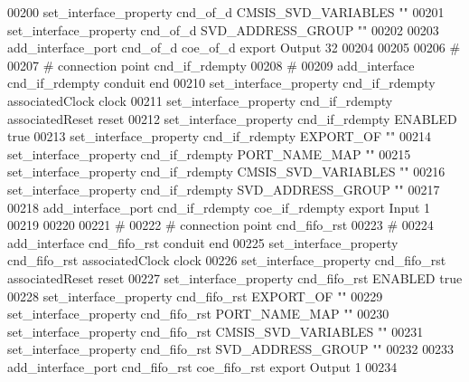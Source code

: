 \begin{DoxyCode}
00200 \textcolor{comment}{}set\_interface\_property cnd\_of\_d CMSIS\_SVD\_VARIABLES ""\textcolor{comment}{}
00201 \textcolor{comment}{}set\_interface\_property cnd\_of\_d SVD\_ADDRESS\_GROUP ""\textcolor{comment}{}
00202 \textcolor{comment}{}
00203 add\_interface\_port cnd\_of\_d coe\_of\_d export Output 32\textcolor{comment}{}
00204 \textcolor{comment}{}
00205 
00206 \textcolor{comment}{# }
00207 \textcolor{comment}{}\textcolor{comment}{# connection point cnd\_if\_rdempty}
00208 \textcolor{comment}{}\textcolor{comment}{# }
00209 \textcolor{comment}{}add\_interface cnd\_if\_rdempty conduit end\textcolor{comment}{}
00210 \textcolor{comment}{}set\_interface\_property cnd\_if\_rdempty associatedClock clock\textcolor{comment}{}
00211 \textcolor{comment}{}set\_interface\_property cnd\_if\_rdempty associatedReset reset\textcolor{comment}{}
00212 \textcolor{comment}{}set\_interface\_property cnd\_if\_rdempty ENABLED true\textcolor{comment}{}
00213 \textcolor{comment}{}set\_interface\_property cnd\_if\_rdempty EXPORT\_OF ""\textcolor{comment}{}
00214 \textcolor{comment}{}set\_interface\_property cnd\_if\_rdempty PORT\_NAME\_MAP ""\textcolor{comment}{}
00215 \textcolor{comment}{}set\_interface\_property cnd\_if\_rdempty CMSIS\_SVD\_VARIABLES ""\textcolor{comment}{}
00216 \textcolor{comment}{}set\_interface\_property cnd\_if\_rdempty SVD\_ADDRESS\_GROUP ""\textcolor{comment}{}
00217 \textcolor{comment}{}
00218 add\_interface\_port cnd\_if\_rdempty coe\_if\_rdempty export Input 1\textcolor{comment}{}
00219 \textcolor{comment}{}
00220 
00221 \textcolor{comment}{# }
00222 \textcolor{comment}{}\textcolor{comment}{# connection point cnd\_fifo\_rst}
00223 \textcolor{comment}{}\textcolor{comment}{# }
00224 \textcolor{comment}{}add\_interface cnd\_fifo\_rst conduit end\textcolor{comment}{}
00225 \textcolor{comment}{}set\_interface\_property cnd\_fifo\_rst associatedClock clock\textcolor{comment}{}
00226 \textcolor{comment}{}set\_interface\_property cnd\_fifo\_rst associatedReset reset\textcolor{comment}{}
00227 \textcolor{comment}{}set\_interface\_property cnd\_fifo\_rst ENABLED true\textcolor{comment}{}
00228 \textcolor{comment}{}set\_interface\_property cnd\_fifo\_rst EXPORT\_OF ""\textcolor{comment}{}
00229 \textcolor{comment}{}set\_interface\_property cnd\_fifo\_rst PORT\_NAME\_MAP ""\textcolor{comment}{}
00230 \textcolor{comment}{}set\_interface\_property cnd\_fifo\_rst CMSIS\_SVD\_VARIABLES ""\textcolor{comment}{}
00231 \textcolor{comment}{}set\_interface\_property cnd\_fifo\_rst SVD\_ADDRESS\_GROUP ""\textcolor{comment}{}
00232 \textcolor{comment}{}
00233 add\_interface\_port cnd\_fifo\_rst coe\_fifo\_rst export Output 1\textcolor{comment}{}
00234 \textcolor{comment}{}
\end{DoxyCode}
